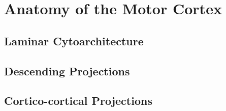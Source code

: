 \section{Anatomy of the Motor Cortex}

\subsection{Laminar Cytoarchitecture}

\subsection{Descending Projections}

\subsection{Cortico-cortical Projections}

